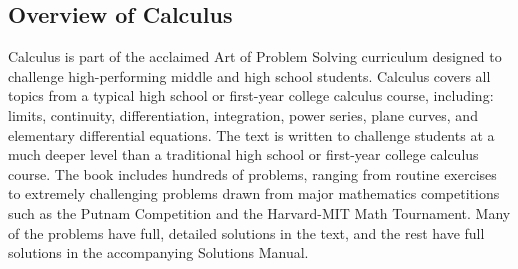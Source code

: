 \documentclass{article}
\begin{document}
\subsection{Overview of Calculus}
Calculus is part of the acclaimed Art of Problem Solving curriculum designed to challenge high-performing middle and high school students. Calculus covers all topics from a typical high school or first-year college calculus course, including: limits, continuity, differentiation, integration, power series, plane curves, and elementary differential equations. The text is written to challenge students at a much deeper level than a traditional high school or first-year college calculus course.
\newline \newline
The book includes hundreds of problems, ranging from routine exercises to extremely challenging problems drawn from major mathematics competitions such as the Putnam Competition and the Harvard-MIT Math Tournament. Many of the problems have full, detailed solutions in the text, and the rest have full solutions in the accompanying Solutions Manual.
\end{document}
